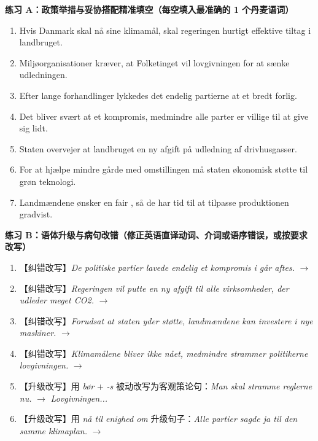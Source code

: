 \textbf{练习 A：政策举措与妥协搭配精准填空（每空填入最准确的 1 个丹麦语词）}
\begin{enumerate}
  \item Hvis Danmark skal nå sine klimamål, skal regeringen hurtigt \underline{\hspace{2.2cm}} effektive tiltag i landbruget.
  \item Miljøorganisationer kræver, at Folketinget vil \underline{\hspace{2.2cm}} lovgivningen for at sænke udledningen.
  \item Efter lange forhandlinger lykkedes det endelig partierne at \underline{\hspace{2.2cm}} et bredt forlig.
  \item Det bliver svært at \underline{\hspace{2.2cm}} et kompromis, medmindre alle parter er villige til at give sig lidt.
  \item Staten overvejer at \underline{\hspace{2.2cm}} landbruget en ny afgift på udledning af drivhusgasser.
  \item For at hjælpe mindre gårde med omstillingen må staten \underline{\hspace{2.2cm}} økonomisk støtte til grøn teknologi.
  \item Landmændene ønsker en fair \underline{\hspace{2.2cm}}, så de har tid til at tilpasse produktionen gradvist.
\end{enumerate}

\textbf{练习 B：语体升级与病句改错（修正英语直译动词、介词或语序错误，或按要求改写）}
\begin{enumerate}
  \item 【纠错改写】\textit{De politiske partier lavede endelig et kompromis i går aftes.} $\rightarrow$
  \item 【纠错改写】\textit{Regeringen vil putte en ny afgift til alle virksomheder, der udleder meget CO2.} $\rightarrow$
  \item 【纠错改写】\textit{Forudsat at staten yder støtte, landmændene kan investere i nye maskiner.} $\rightarrow$
  \item 【纠错改写】\textit{Klimamålene bliver ikke nået, medmindre strammer politikerne lovgivningen.} $\rightarrow$
  \item 【升级改写】用 \textit{bør} + \textit{-s} 被动改写为客观策论句：\textit{Man skal stramme reglerne nu.} $\rightarrow$ \textit{Lovgivningen...}
  \item 【升级改写】用 \textit{nå til enighed om} 升级句子：\textit{Alle partier sagde ja til den samme klimaplan.} $\rightarrow$
\end{enumerate}


